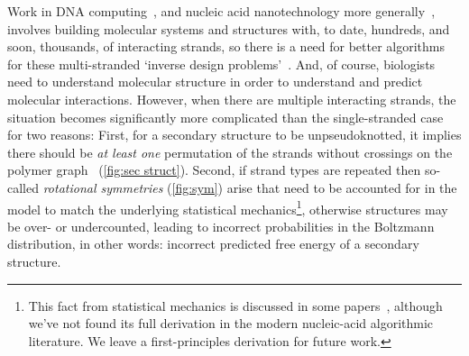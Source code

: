 Work in DNA computing~\cite{algoSST,squareRoot,cargoSorting,SIMDDNA,celltimer2017fernshulman,Chatterjee2017,seelig2006enzyme,zhang2011dynamic}, and nucleic acid nanotechnology more generally~\cite{geary2014single,woo2011programmable}, involves building molecular systems and structures with, to date, hundreds, and soon, thousands, of interacting strands, so there is a need for better algorithms for these multi-stranded `inverse design problems'~\cite{churkin2018design,nuad}.  
And, of course, biologists need to understand molecular structure in order to understand and predict molecular interactions. 
However, when there are multiple interacting strands, the situation becomes significantly more complicated than the single-stranded case for two reasons:  
First, for a secondary structure to be unpseudoknotted, it implies there should be {\em at least one} permutation of the strands without crossings on the polymer graph~\cite{dirks2007thermodynamic} (\cref{fig:sec struct}). 
Second, if strand types are repeated then 
so-called {\em rotational symmetries} (\cref{fig:sym}) arise that need to be accounted for in the model to match the underlying statistical mechanics\footnote{This fact from statistical mechanics is discussed in some papers~\cite{dirks2007thermodynamic,hofacker2012symmetric}, although we've not found its full derivation in the modern nucleic-acid algorithmic literature. We leave a first-principles derivation for future work.\label{ft:statmech}}, otherwise structures may be over- or undercounted, leading to incorrect probabilities in the Boltzmann distribution, in other words: incorrect predicted free energy of a secondary structure.


